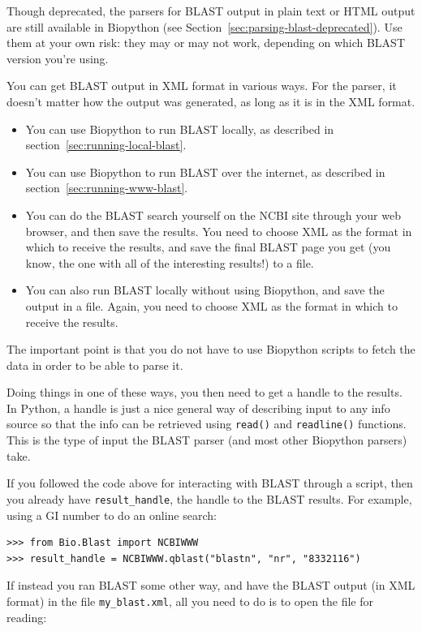 \documentclass{report}
\begin{document}
Though deprecated, the parsers for BLAST output in plain text or HTML output
are still available in Biopython
(see Section~\ref{sec:parsing-blast-deprecated}).
Use them at your own risk: they may or may not work, depending on which BLAST
version you're using.

You can get BLAST output in XML format in various ways. For the parser, it
doesn't matter how the output was generated, as long as it is in the XML format.
\begin{itemize}
\item You can use Biopython to run BLAST locally, as described in
section~\ref{sec:running-local-blast}.
\item You can use Biopython to run BLAST over the internet, as described in
section~\ref{sec:running-www-blast}.
\item You can do the BLAST search yourself on the NCBI site through your
web browser, and then save the results. You need to choose XML as the format
in which to receive the results, and save the final BLAST page you get
(you know, the one with all of the interesting results!) to a file.
\item You can also run BLAST locally without using Biopython, and save
the output in a file. Again, you need to choose XML as the format in which
to receive the results.
\end{itemize}
The important point is that you do not have to use Biopython
scripts to fetch the data in order to be able to parse it.

Doing things in one of these ways, you then need to get a handle
to the results. In Python, a handle is just a nice general way of
describing input to any info source so that the info can be retrieved
using \verb|read()| and \verb|readline()| functions. This is the type
of input the BLAST parser (and most other Biopython parsers) take.

If you followed the code above for interacting with BLAST through a
script, then you already have \verb|result_handle|, the handle to the
BLAST results.  For example, using a GI number to do an online search:

\begin{verbatim}
>>> from Bio.Blast import NCBIWWW
>>> result_handle = NCBIWWW.qblast("blastn", "nr", "8332116")
\end{verbatim}

If instead you ran BLAST some other way, and have the
BLAST output (in XML format) in the file \verb|my_blast.xml|, all you
need to do is to open the file for reading:
\end{document}
